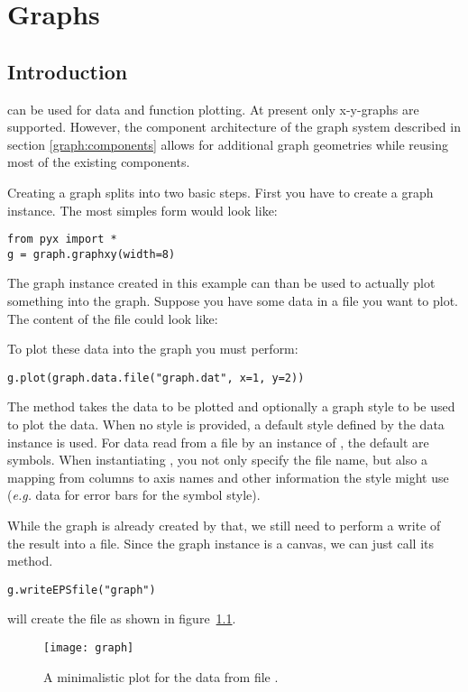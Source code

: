 \chapter{Graphs\label{graph}}
\section{Introduction}
\PyX{} can be used for data and function plotting. At present only
x-y-graphs are supported. However, the component architecture of the
graph system described in section \ref{graph:components} allows for
additional graph geometries while reusing most of the existing
components.

Creating a graph splits into two basic steps. First you have to create
a graph instance. The most simples form would look like:
\begin{verbatim}
from pyx import *
g = graph.graphxy(width=8)
\end{verbatim}
The graph instance  created in this example can than be used
to actually plot something into the graph. Suppose you have some data
in a file  you want to plot. The content of the file
could look like:

To plot these data into the graph  you must perform:
\begin{verbatim}
g.plot(graph.data.file("graph.dat", x=1, y=2))
\end{verbatim}
The method  takes the data to be plotted and optionally
a graph style to be used to plot the data. When no style is provided,
a default style defined by the data instance is used. For data read
from a file by an instance of , the default are
symbols. When instantiating , you not only
specify the file name, but also a mapping from columns to axis names
and other information the style might use (\emph{e.g.} data for error
bars for the symbol style).

While the graph is already created by that, we still need to perform a
write of the result into a file. Since the graph instance is a canvas,
we can just call its  method.
\begin{verbatim}
g.writeEPSfile("graph")
\end{verbatim}
will create the file  as shown in
figure~\ref{fig:graph}.

\begin{figure}[ht]
\centerline{\texttt{[image: graph]}}
\caption{A minimalistic plot for the data from file .}
\label{fig:graph}
\end{figure}

